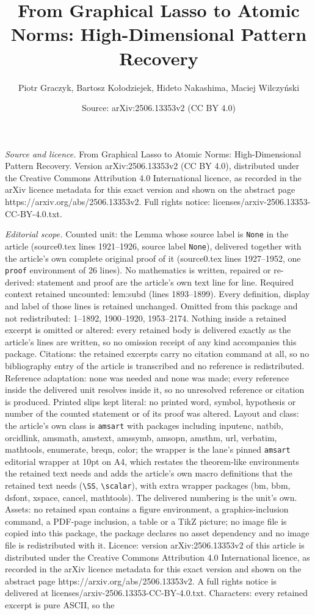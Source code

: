 \documentclass[10pt,a4paper]{amsart}
\title[From Graphical Lasso to Atomic Norms: High-Dimensional Patte]{From Graphical Lasso to Atomic Norms: High-Dimensional Pattern Recovery}
\author{Piotr Graczyk, Bartosz Ko{\l}odziejek, Hideto Nakashima, Maciej Wilczy\'nski}
\date{Source: arXiv:2506.13353v2 (CC BY 4.0)}
\begin{document}
\maketitle

\noindent\emph{Source and licence.} From Graphical Lasso to Atomic Norms: High-Dimensional Pattern Recovery. Version arXiv:2506.13353v2 (CC BY 4.0), distributed under the Creative Commons Attribution 4.0 International licence, as recorded in the arXiv licence metadata for this exact version and shown on the abstract page https://arxiv.org/abs/2506.13353v2. Full rights notice: licenses/arxiv-2506.13353-CC-BY-4.0.txt.\par\smallskip

\noindent\textit{Editorial scope.} Counted unit: the Lemma whose source label is \texttt{None} in the article (source0.tex lines 1921--1926, source label \texttt{None}), delivered together with the article's own complete original proof of it (source0.tex lines 1927--1952, one \texttt{proof} environment of 26 lines). No mathematics is written, repaired or re-derived: statement and proof are the article's own text line for line. Required context retained uncounted: lem:subd (lines 1893--1899). Every definition, display and label of those lines is retained unchanged. Omitted from this package and not redistributed: 1--1892, 1900--1920, 1953--2174. Nothing inside a retained excerpt is omitted or altered: every retained body is delivered exactly as the article's lines are written, so no omission receipt of any kind accompanies this package. Citations: the retained excerpts carry no citation command at all, so no bibliography entry of the article is transcribed and no reference is redistributed. Reference adaptation: none was needed and none was made; every reference inside the delivered unit resolves inside it, so no unresolved reference or citation is produced. Printed slips kept literal: no printed word, symbol, hypothesis or number of the counted statement or of its proof was altered. Layout and class: the article's own class is \texttt{amsart} with packages including inputenc, natbib, orcidlink, amsmath, amstext, amssymb, amsopn, amsthm, url, verbatim, mathtools, enumerate, breqn, color; the wrapper is the lane's pinned \texttt{amsart} editorial wrapper at 10pt on A4, which restates the theorem-like environments the retained text needs and adds the article's own macro definitions that the retained text needs (\texttt{\textbackslash SS}, \texttt{\textbackslash scalar}), with extra wrapper packages (bm, bbm, dsfont, xspace, cancel, mathtools). The delivered numbering is the unit's own. Assets: no retained span contains a figure environment, a graphics-inclusion command, a PDF-page inclusion, a table or a TikZ picture; no image file is copied into this package, the package declares no asset dependency and no image file is redistributed with it. Licence: version arXiv:2506.13353v2 of this article is distributed under the Creative Commons Attribution 4.0 International licence, as recorded in the arXiv licence metadata for this exact version and shown on the abstract page https://arxiv.org/abs/2506.13353v2. A full rights notice is delivered at licenses/arxiv-2506.13353-CC-BY-4.0.txt. Characters: every retained excerpt is pure ASCII, so the 
\end{document}
